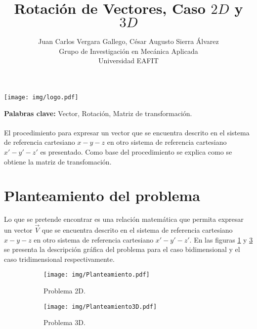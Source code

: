 \documentclass[12pt,letterpaper, twoside, openany]{article}
\author{Juan Carlos Vergara Gallego, César Augusto Sierra Álvarez\\
Grupo de Investigación en Mecánica Aplicada \\ Universidad EAFIT}
\title{\textbf{Rotación de Vectores, Caso $2D$ y $3D$}}
\begin{document}
\pagestyle{fancyplain}
\fancyhf{}
\headheight=20pt %
\renewcommand{\headrulewidth}{0pt} %

\lhead %
{
\begin{minipage}{3cm}
\texttt{[image: img/logo.pdf]}
\end{minipage}
}

\fancyfoot[c]{\thepage}

\maketitle


{\bf Palabras clave:} Vector, Rotación, Matriz de transformación.\\\\

\abstract
%
El procedimiento para expresar un vector que se encuentra descrito en el sistema de referencia cartesiano $x-y-z$ en otro sistema de referencia cartesiano $x'-y'-z'$ es presentado. Como base del procedimiento se explica como se obtiene la matriz de transfomación. 
%
%
\section{Planteamiento del problema}
%
Lo que se pretende encontrar es una relación matemática que permita  expresar un vector  $\overset{\rightarrow}{V}$ que se encuentra descrito en el sistema de referencia cartesiano $x-y-z$ en otro sistema de referencia cartesiano $x'-y'-z'$. En las figuras \ref{planteamiento} y \ref{planteamiento3d} se presenta la descripción gráfica del problema para el caso bidimensional y el caso tridimensional respectivamente.  
%
\begin{figure}[H]
%	
	\centering
	\begin{subfigure}[l]{0.450\textwidth}
		\texttt{[image: img/Planteamiento.pdf]}
		\caption{Problema 2D.}
		\label{planteamiento}
	\end{subfigure}
	\hspace{.5 cm}
	\begin{subfigure}[r]{0.450\textwidth}
		\texttt{[image: img/Planteamiento3D.pdf]}
		\caption{Problema 3D.}
		\label{planteamiento3d}
	\end{subfigure}	
	\caption{}
\end{figure}
%
%
\end{document}
